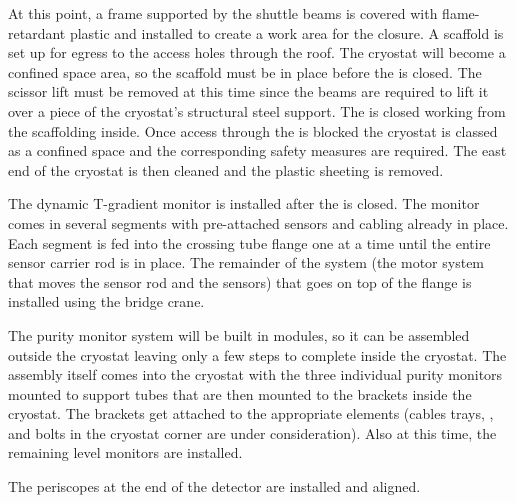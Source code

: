 At this point, a frame supported by the shuttle beams is covered with flame-retardant plastic and installed to create a work area for the  closure.  A scaffold is set up for egress to the access holes through the roof.
The cryostat will become a confined space area, so the scaffold  must be in place before the  is closed.  
The scissor lift must be removed at this time since the  beams are required to lift it over a piece of the cryostat's structural steel support. 
The  is closed working from the scaffolding inside. 
Once access through the  is blocked the cryostat is classed as a confined space and the corresponding safety measures are required.
The east end of the cryostat is then cleaned and the plastic sheeting is removed. 


The dynamic T-gradient monitor is installed after the  is closed. 
The monitor comes in several segments with pre-attached sensors and cabling already in place. Each segment is fed into the crossing tube flange one at a time until the entire sensor carrier rod is in place. 
The remainder of the system (the motor system that moves the sensor rod and the sensors) that goes on top of the flange is installed using the bridge crane. 

The purity monitor system will be built in modules, so it can be assembled outside the cryostat leaving only a few steps to complete inside the cryostat. 
The assembly itself comes into the cryostat with the three individual purity monitors mounted to support tubes that are then mounted to the brackets inside the cryostat. The brackets get attached to the appropriate elements (cables trays, , and bolts in the cryostat corner are under consideration). Also at this time, the remaining level monitors are installed.

The periscopes at the end of the detector are installed and aligned. 

